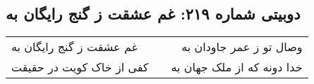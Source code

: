 \begin{center}
\section*{دوبیتی شماره ۲۱۹: غم عشقت ز گنج رایگان به}
\label{sec:219}
\begin{longtable}{l p{0.5cm} r}
غم عشقت ز گنج رایگان به
&&
وصال تو ز عمر جاودان به
\\
کفی از خاک کویت در حقیقت
&&
خدا دونه که از ملک جهان به
\\
\end{longtable}
\end{center}
